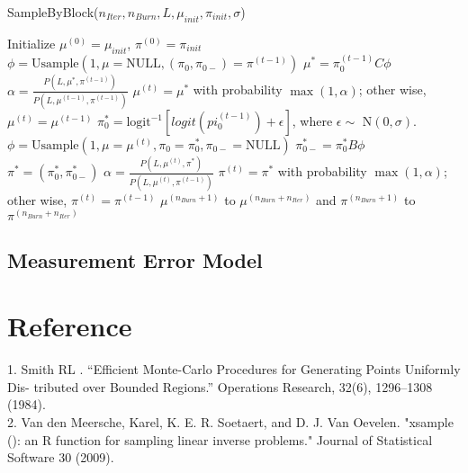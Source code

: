 \documentclass[11 pt, a4paper]{article}  %
\begin{document}
\begin{algorithm}[H]
\caption{SampleByBlock($n_{Iter}, n_{Burn}, L, \mu_{init}, \pi_{init}, \sigma$)}
\begin{algorithmic}[1]
\State Initialize $\mu^{(0)} = \mu_{init}$, $\pi^{(0)} = \pi_{init}$
\State $\phi = \text{Usample} (1, \mu=\text{NULL}, (\pi_0,\pi_{0-})=\pi^{(t-1)})$
\State $\mu^* = \pi_0^{(t-1)} C \phi $
\State $\alpha = \frac{P(L, \mu^*, \pi^{(t-1)} )}{P(L, \mu^{(t-1)}, \pi^{(t-1)} )}$
\State $\mu^{(t)} = \mu^*$ with probability $\max(1, \alpha)$; other wise, $\mu^{(t)} = \mu^{(t-1)}$
\State $\pi^*_{0} = \text{logit}^{-1}[logit(pi_{0}^{(t-1)}) + \epsilon]$, where $\epsilon \sim $ N$(0, \sigma)$.
\State $\phi = \text{Usample} (1, \mu=\mu^{(t)}, \pi_0=\pi^*_{0},\pi_{0-}=\text{NULL})$
\State $\pi^*_{0-} = \pi^*_{0} B \phi$
\State $\pi^* = (\pi^*_{0}, \pi^*_{0-})$
\State $\alpha = \frac{P(L, \mu^{(t)}, \pi^* )}{P(L, \mu^{(t)}, \pi^{(t-1)} )}$
\State $\pi^{(t)} = \pi^*$ with probability $\max(1, \alpha)$; other wise, $\pi^{(t)} = \pi^{(t-1)} $
\EndFor
{} $\mu^{(n_{Burn}+1)}$ to $\mu^{(n_{Burn} + n_{Iter})}$ and $\pi^{(n_{Burn}+1)}$ to $\pi^{(n_{Burn} + n_{Iter})}$
\end{algorithmic}
\end{algorithm}



\newpage
\subsection{Measurement Error Model}



%





\newpage
\section*{Reference}
1. Smith RL . “Efficient Monte-Carlo Procedures for Generating Points Uniformly Dis- tributed over Bounded Regions.” Operations Research, 32(6), 1296–1308 (1984).\\ 
2. Van den Meersche, Karel, K. E. R. Soetaert, and D. J. Van Oevelen. "xsample (): an R function for sampling linear inverse problems." Journal of Statistical Software 30 (2009).
\end{document}
